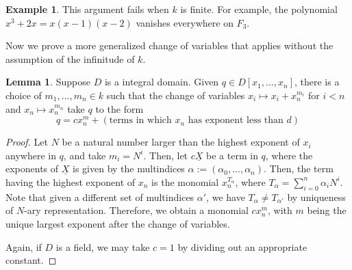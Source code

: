 \documentclass{article}
\theoremstyle{definition}
\theoremstyle{definition}
\theoremstyle{definition}
\theoremstyle{definition}
\newtheorem{lemma}[theorem]{Lemma}
\theoremstyle{definition}
\theoremstyle{definition}
\theoremstyle{definition}
\newtheorem{example}{Example}[section]
\begin{document}
\begin{tcolorbox}[colback=yellow!5!white,colframe=yellow!30!white]
\begin{example}
This argument fails when $k$ is finite. For example, the polynomial $x^3+2x=x(x-1)(x-2)$ vanishes everywhere on $F_3$. 
\end{example}
\end{tcolorbox}

Now we prove a more generalized change of variables that applies without the assumption of the infinitude of $k$.
\begin{tcolorbox}
\begin{lemma}
    Suppose $D$ is a integral domain. Given $q\in D[x_1,...,x_n]$, there is a choice of $m_1,...,m_n\in k$ such that the change of variables $x_i\mapsto x_i+x_n^{m_i}$ for $i<n$ and $x_n\mapsto x_n^{m_n}$ take $q$ to the form 
    \[q=cx_n^{m}+(\textrm{terms in which }x_n\textrm{ has exponent less than }d)\]
\end{lemma}
\end{tcolorbox}
\begin{proof}
    Let $N$ be a natural number larger than the highest exponent of $x_i$ anywhere in $q$, and take $m_i=N^i$. Then, let $c\underline{X}$ be a term in $q$, where the exponents of $\underline{X}$ is given by the multindices $\alpha:=(\alpha_0,...,\alpha_n)$. Then, the term having the highest exponent of $x_n$ is the monomial $x_n^{T_{\alpha}}$, where $T_{\alpha}=\sum_{i=0}^{n}\alpha_iN^i$. Note that given a different set of multindices $\alpha'$, we have $T_{\alpha}\neq T_{\alpha'}$ by uniqueness of $N$-ary representation. Therefore, we obtain a monomial $cx_n^{m}$, with $m$ being the unique largest exponent after the change of variables. 

    Again, if $D$ is a field, we may take $c=1$ by dividing out an appropriate constant. 
\end{proof}
\end{document}
